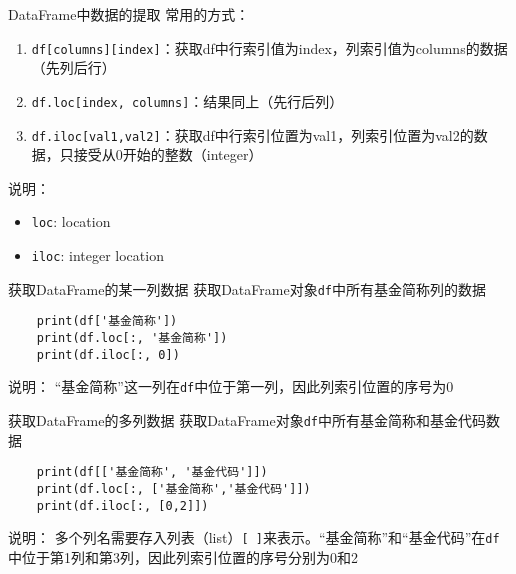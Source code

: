 \documentclass[t]{beamer}
\begin{document}
\begin{frame}{DataFrame中数据的提取}
常用的方式：
\begin{enumerate}
    \item \texttt{df[columns][index]}：获取df中{\color{blue}行索引值}为index，{\color{blue}列索引值}为columns的数据（先列后行）
    \item \texttt{df.loc[index, columns]}：结果同上（先行后列）
    \item \texttt{df.iloc[val1,val2]}：获取df中{\color{red}行索引位置}为val1，{\color{red}列索引位置}为val2的数据，只接受从0开始的{\color{red}整数}（integer）
\end{enumerate}

\begin{block}{说明：}
\begin{itemize}
    \item \texttt{loc}: {\color{blue}loc}ation
    \item \texttt{iloc}: {\color{red}i}nteger {\color{red}loc}ation
\end{itemize}
\end{block}
\end{frame}

\begin{frame}[fragile]{获取DataFrame的某一列数据}
获取DataFrame对象\verb|df|中所有基金简称列的数据
\begin{lstlisting}
    print(df['基金简称'])
    print(df.loc[:, '基金简称'])
    print(df.iloc[:, 0])
\end{lstlisting}
\begin{block}{说明：}
    “基金简称”这一列在\verb|df|中位于第一列，因此列索引位置的序号为0
\end{block}
\end{frame}


\begin{frame}[fragile]{获取DataFrame的多列数据}
    获取DataFrame对象\verb|df|中所有基金简称和基金代码数据
\begin{lstlisting}
    print(df[['基金简称', '基金代码']]) 
    print(df.loc[:, ['基金简称','基金代码']])
    print(df.iloc[:, [0,2]])
\end{lstlisting}
\begin{block}{说明：}
    多个列名需要存入列表（list）\verb|[ ]|来表示。“基金简称”和“基金代码”在\verb|df|中位于第1列和第3列，因此列索引位置的序号分别为0和2
\end{block}

\end{frame}
\end{document}
